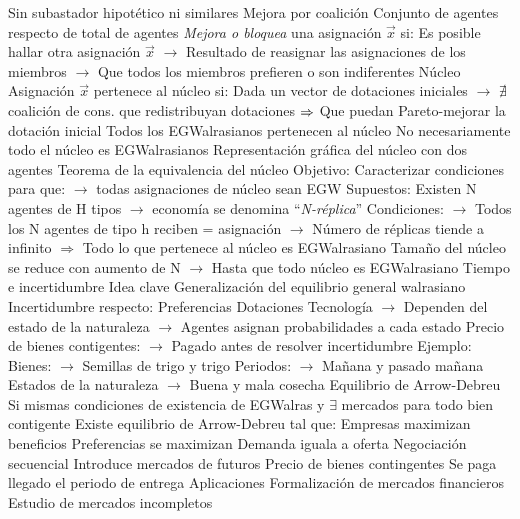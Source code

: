 \documentclass{nuevotema}
\begin{document}
\begin{esquemal}
				\4[$\then$] Sin subastador hipotético ni similares
			\3 Mejora por coalición
				\4 Conjunto de agentes respecto de total de agentes
				\4[] \textit{Mejora o bloquea} una asignación $\vec{x}$ si:
				\4 Es posible hallar otra asignación $\vec{x}$
				\4[] $\to$ Resultado de reasignar las asignaciones de los miembros
				\4[] $\to$ Que todos los miembros prefieren o son indiferentes
			\3 Núcleo
				\4 Asignación $\vec{x}$ pertenece al núcleo si:
				\4[] Dada un vector de dotaciones iniciales
				\4[] $\to$ $\nexists$ coalición de cons. que redistribuyan dotaciones
				\4[] $\then$ Que puedan Pareto-mejorar la dotación inicial
				\4[$\then$] Todos los EGWalrasianos pertenecen al núcleo
				\4[$\then$] No necesariamente todo el núcleo es EGWalrasianos
				\4 Representación gráfica del núcleo con dos agentes
				\4[] 
			\3 Teorema de la equivalencia del núcleo
				\4 Objetivo:
				\4[] Caracterizar condiciones para que:
				\4[] $\to$ todas asignaciones de núcleo sean EGW
				\4 Supuestos:
				\4[] Existen N agentes de H tipos
				\4[] $\to$ economía se denomina ``\textit{N-réplica}''
				\4 Condiciones:
				\4[] $\to$ Todos los N agentes de tipo h reciben = asignación
				\4[] $\to$ Número de réplicas tiende a infinito
				\4[] $\Rightarrow$ Todo lo que pertenece al núcleo es EGWalrasiano
				\4 Tamaño del núcleo se reduce con aumento de N
				\4[] $\to$ Hasta que todo núcleo es EGWalrasiano
		\2 Tiempo e incertidumbre
			\3 Idea clave
				\4 Generalización del equilibrio general walrasiano
				\4 Incertidumbre respecto:
				\4[] Preferencias
				\4[] Dotaciones
				\4[] Tecnología
				\4[] $\to$ Dependen del estado de la naturaleza
				\4[] $\to$ Agentes asignan probabilidades a cada estado
				\4 Precio de bienes contigentes:
				\4[] $\to$ Pagado antes de resolver incertidumbre
				\4 Ejemplo:
				\4[] Bienes:
				\4[] $\to$ Semillas de trigo y trigo
				\4[] Periodos:
				\4[] $\to$ Mañana y pasado mañana
				\4[] Estados de la naturaleza
				\4[] $\to$ Buena y mala cosecha
			\3 Equilibrio de Arrow-Debreu
				\4 Si mismas condiciones de existencia de EGWalras
				\4[] y $\exists$ mercados para todo bien contigente
				\4[$\Rightarrow$] Existe equilibrio de Arrow-Debreu tal que:
				\4[] Empresas maximizan beneficios
				\4[] Preferencias se maximizan
				\4[] Demanda iguala a oferta
			\3 Negociación secuencial
				\4 Introduce mercados de futuros
				\4 Precio de bienes contingentes
				\4[] Se paga llegado el periodo de entrega
			\3 Aplicaciones
				\4 Formalización de mercados financieros
				\4 Estudio de mercados incompletos

\end{esquemal}
\end{document}

